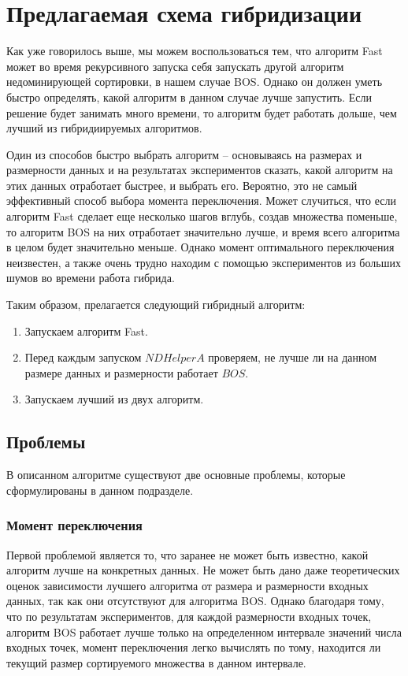 \section{Предлагаемая схема гибридизации}

Как уже говорилось выше, мы можем воспользоваться тем, что алгоритм Fast может во время рекурсивного запуска
себя запускать другой алгоритм недоминирующей сортировки, в нашем случае BOS. Однако он должен уметь быстро
определять, какой алгоритм в данном случае лучше запустить. Если решение будет занимать много времени, то
алгоритм будет работать дольше, чем лучший из гибридиируемых алгоритмов.

Один из способов быстро выбрать алгоритм -- основываясь на размерах и размерности данных и на результатах
экспериментов сказать, какой алгоритм на этих данных отработает быстрее, и выбрать его. Вероятно, это не самый
эффективный способ выбора момента переключения. Может случиться, что если алгоритм Fast сделает еще несколько шагов
вглубь, создав множества поменьше, то алгоритм BOS на них отработает значительно лучше, и время всего алгоритма в
целом будет значительно меньше. Однако момент оптимального переключения неизвестен, а также очень трудно находим
с помощью экспериментов из больших шумов во времени работа гибрида.

Таким образом, прелагается следующий гибридный алгоритм:
\begin{enumerate}
 \item Запускаем алгоритм Fast.
 \item Перед каждым запуском $NDHelperA$ проверяем, не лучше ли на данном размере данных и размерности работает $BOS$.
 \item Запускаем лучший из двух алгоритм.
\end{enumerate}

\subsection{Проблемы}

В описанном алгоритме существуют две основные проблемы, которые сформулированы в данном подразделе.

\subsubsection{Момент переключения}

Первой проблемой является то, что заранее не может быть известно, какой алгоритм лучше на конкретных данных. Не
может быть дано даже теоретических оценок зависимости лучшего алгоритма от размера и размерности входных данных,
так как они отсутствуют для алгоритма BOS. Однако благодаря тому, что по результатам экспериментов, для каждой
размерности входных точек, алгоритм BOS работает лучше только на определенном интервале значений числа входных
точек, момент переключения легко вычислять по тому, находится ли текущий размер сортируемого множества в данном
интервале.

